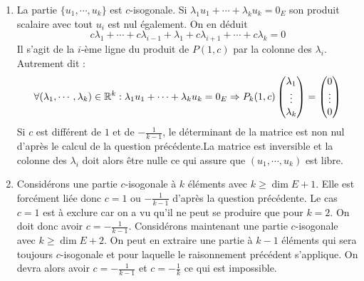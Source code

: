 \begin{enumerate}
  \item La partie $\{u_1,\cdots,u_k\}$ est $c$-isogonale. Si $\lambda_1u_1+\cdots+\lambda_k u_k=0_E$ son produit scalaire avec tout $u_i$ est nul également. On en déduit
\begin{displaymath}
 c\lambda_1+\cdots +c\lambda_{i-1}+\lambda_1 +c\lambda_{i+1}+\cdots+c\lambda_k =0
\end{displaymath}
Il s'agit de la $i$-ème ligne du produit de $P(1,c)$ par la colonne des $\lambda_i$. Autrement dit :
\begin{displaymath}
\forall (\lambda_1,\cdots,\lambda_k)\in \mathbb{R}^k : \lambda_1 u_1 + \cdots +\lambda_ku_k=0_E 
\Rightarrow
P_k(1,c)
\begin{pmatrix}
 \lambda_1 \\ \vdots \\ \lambda_k         
\end{pmatrix}
=
\begin{pmatrix}
 0 \\ \vdots \\ 0         
\end{pmatrix}
\end{displaymath}
Si $c$ est différent de $1$ et de $-\frac{1}{k-1}$, le déterminant de la matrice est non nul d'après le calcul de la question précédente.La matrice est inversible et la colonne des $\lambda_i$ doit alors être nulle ce qui assure que $(u_1,\cdots,u_k)$ est libre.
  \item Considérons une partie $c$-isogonale à $k$ éléments avec $k\geq \dim E+1$. Elle est forcément liée donc $c=1$ ou $-\frac{1}{k-1}$ d'après la question précédente. Le cas $c=1$ est à exclure car on a vu qu'il ne peut se produire que pour $k=2$. On doit donc avoir $c=-\frac{1}{k-1}$.\newline
Considérons maintenant une partie $c$-isogonale avec $k\geq\dim E+2$. On peut en extraire une partie à $k-1$ éléments qui sera toujours $c$-isogonale et pour laquelle le raisonnement précédent s'applique. On devra alors avoir $c=-\frac{1}{k-1}$ et
$c=-\frac{1}{k}$ ce qui est impossible. 
 \end{enumerate}

